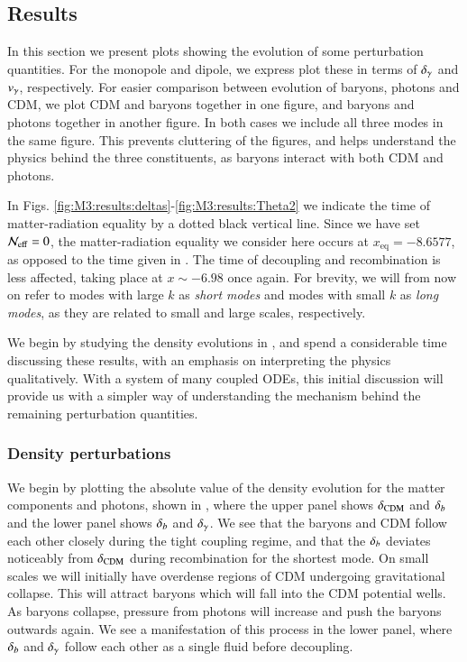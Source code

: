 \subsection{Results}\label{ssec:M3:results}

In this section we present plots showing the evolution of some perturbation quantities. For the monopole and dipole, we express plot these in terms of $\delta_\gamma$ and $v_\gamma$, respectively. For easier comparison between evolution of baryons, photons and CDM, we plot CDM and baryons together in one figure, and baryons and photons together in another figure. In both cases we include all three modes in the same figure. This prevents cluttering of the figures, and helps understand the physics behind the three constituents, as baryons interact with both CDM and photons. 

In Figs. \ref{fig:M3:results:deltas}-\ref{fig:M3:results:Theta2} we indicate the time of matter-radiation equality by a dotted black vertical line. Since we have set $\mathcal{N}_\mathrm{eff}=0$, the matter-radiation equality we consider here occurs at $x_\mathrm{eq}=-8.6577$, as opposed to the time given in . The time of decoupling and recombination is less affected, taking place at $x\sim-6.98$ once again. For brevity, we will from now on refer to modes with large $k$ as \textit{short modes} and modes with small $k$ as \textit{long modes}, as they are related to small and large scales, respectively. 

We begin by studying the density evolutions in , and spend a considerable time discussing these results, with an emphasis on interpreting the physics qualitatively. With a system of many coupled ODEs, this initial discussion will provide us with a simpler way of understanding the mechanism behind the remaining perturbation quantities.

\subsubsection{Density perturbations} \label{sssec:M3:results:density_perturbations}

We begin by plotting the absolute value of the density evolution for the matter components and photons, shown in , where the upper panel shows $\delta_\mathrm{CDM}$ and $\delta_b$ and the lower panel shows $\delta_b$ and $\delta_\gamma$. We see that the baryons and CDM follow each other closely during the tight coupling regime, and that the $\delta_b$ deviates noticeably from $\delta_\mathrm{CDM}$ during recombination for the shortest mode. On small scales we will initially have overdense regions of CDM undergoing gravitational collapse. This will attract baryons which will fall into the CDM potential wells. As baryons collapse, pressure from photons will increase and push the baryons outwards again. We see a manifestation of this process in the lower panel, where $\delta_b$ and $\delta_\gamma$ follow each other as a single fluid before decoupling. 

